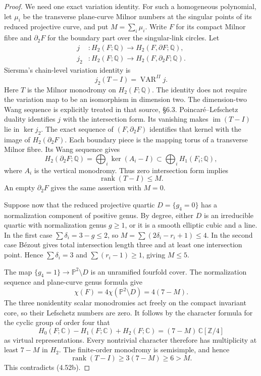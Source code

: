 \begin{proof}
We need one exact variation identity. For such a
homogeneous polynomial, let $\mu_i$ be the
transverse plane-curve Milnor numbers at the
singular points of its reduced projective curve,
and put $M=\sum_i\mu_i$. Write $F$ for its compact
Milnor fibre and $\partial_2F$ for the boundary
part over the singular-link circles. Let
\[
 \begin{split}
 j&:H_2(F;\mathbb Q)\longrightarrow
                         H_2(F,\partial F;\mathbb Q),\\
 j_2&:H_2(F;\mathbb Q)\longrightarrow
                         H_2(F,\partial_2F;\mathbb Q).
 \end{split}
\]
Siersma's chain-level variation identity
\cite[\S3.6, pp.~451--452; \S7.1, p.~462]
{Siersma1991Variation} is
\[
                 j_2(T-I)=\operatorname{VAR}^{II}j.
                                                            \tag{4.52a}
\]
Here $T$ is the Milnor monodromy on $H_2(F;\mathbb Q)$.
The identity does not require the variation map to
be an isomorphism in dimension two. The dimension-two
Wang sequence is explicitly treated in that source,
\S6.3. Poincar\'e--Lefschetz duality identifies $j$
with the intersection form. Its vanishing makes
$\operatorname{im}(T-I)$ lie in $\ker j_2$.
The exact sequence of $(F,\partial_2F)$ identifies
that kernel with the image of $H_2(\partial_2F)$.
Each boundary piece is the mapping torus of a
transverse Milnor fibre. Its Wang sequence gives
\[
 H_2(\partial_2F;\mathbb Q)
       =\bigoplus_i\ker(A_i-I)\subset
                        \bigoplus_iH_1(F_i;\mathbb Q),
\]
where $A_i$ is the vertical monodromy. Thus zero
intersection form implies
\[
                 \operatorname{rank}(T-I)\le M.             \tag{4.52b}
\]
An empty $\partial_2F$ gives the same assertion with
$M=0$.

Suppose now that the reduced projective quartic
$D=\{g_4=0\}$ has a normalization component of
positive genus. By degree, either $D$ is an
irreducible quartic with normalization genus
$g\ge1$, or it is a smooth elliptic cubic and a
line. In the first case
$\sum\delta_i=3-g\le2$, so
$M=\sum(2\delta_i-r_i+1)\le4$.
In the second case B\'ezout gives total intersection
length three and at least one intersection point.
Hence $\sum\delta_i=3$ and
$\sum(r_i-1)\ge1$, giving $M\le5$.

The map $\{g_4=1\}\to\mathbb P^2\setminus D$ is
an unramified fourfold cover. The normalization
sequence and plane-curve genus formula give
\[
              \chi(F)=4\chi(\mathbb P^2\setminus D)
                      =4(7-M).
\]
The three nonidentity scalar monodromies act freely
on the compact invariant core, so their Lefschetz
numbers are zero. It follows by the character
formula for the cyclic group of order four that
\[
 H_0(F;\mathbb C)-H_1(F;\mathbb C)+H_2(F;\mathbb C)
       =(7-M)\,\mathbb C[\mathbb Z/4]
\]
as virtual representations. Every nontrivial
character therefore has multiplicity at least
$7-M$ in $H_2$. The finite-order monodromy is
semisimple, and hence
\[
             \operatorname{rank}(T-I)
                   \ge3(7-M)\ge6>M.                       \tag{4.52c}
\]
This contradicts (4.52b).


\end{proof}
